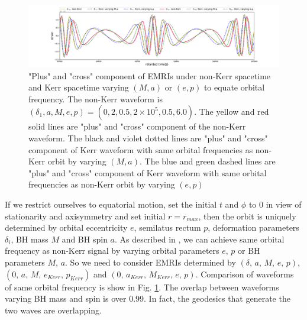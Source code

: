 \documentclass{article}
\begin{document}
\begin{figure}[!ht]
	\centering
	\includegraphics[width=16cm]{eg.pdf}
	
	\caption{"Plus" and "cross" component of EMRIs under non-Kerr spacetime and Kerr spacetime varying $(M,a)$ or $(e,p)$ to equate orbital frequency. The non-Kerr waveform is $(\delta_1,a,M,e,p)=(0,2,0.5,2\times10^5, 0.5,6.0)$. The yellow and red solid lines are "plus" and "cross" component of the non-Kerr waveform. The black and violet dotted lines are "plus" and "cross" component of Kerr waveform with same orbital frequencies as non-Kerr orbit by varying $(M,a)$. The blue and green dashed lines are "plus" and "cross" component of Kerr waveform with same orbital frequencies as non-Kerr orbit by varying $(e,p)$ }
	\label{kkwave}
\end{figure}	

If we restrict ourselves to equatorial motion, set the initial $t$ and $\phi$ to 0 in view of stationarity and axisymmetry and set initial $r=r_{max}$, then the orbit is uniquely determined by orbital eccentricity $e$, semilatus rectum $p$, deformation parameters $\delta_i$, BH mass $M$ and BH spin $a$. As described in \cite{majorPRD}, we can achieve same orbital frequency as non-Kerr signal by varying orbital parameters $e, \,p$ or BH parameters $M, \, a$. So we need to consider EMRIs determined by $(\delta,\, a,\, M,\, e,\, p)$, $(0,\, a,\, M,\, e_{Kerr},\, p_{Kerr})$ and $(0,\, a_{Kerr},\, M_{Kerr},\, e,\, p)$. Comparison of waveforms of same orbital frequency is show in Fig. \ref{kkwave}. The overlap between waveforms varying BH mass and spin is over 0.99. In fact, the geodesics that generate the two waves are overlapping.  
\end{document}
